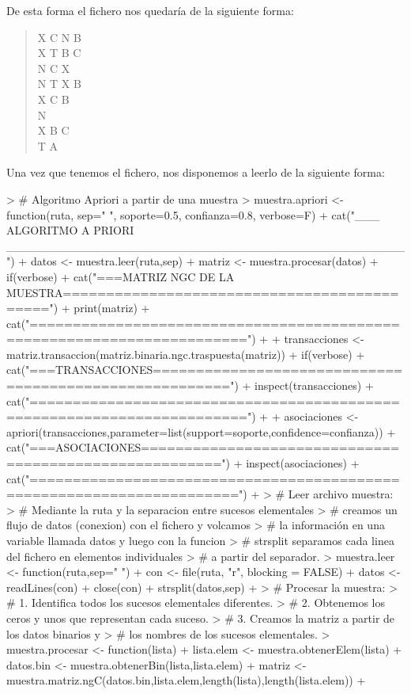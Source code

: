 \documentclass [a4paper] {article}
\begin{document}
De esta forma el fichero nos quedaría de la siguiente forma:
\begin{quote}
X C N B \\
X T B C \\
N C X \\
N T X B \\
X C B \\
N \\
X B C \\
T A \\

\end{quote}

Una vez que tenemos el fichero, nos disponemos a leerlo de la siguiente forma:

\newpage

\begin{Schunk}
\begin{Sinput}
> # Algoritmo Apriori a partir de una muestra
> muestra.apriori <- function(ruta, sep=" ", soporte=0.5, confianza=0.8, verbose=F){
+ 	cat("___ ALGORITMO A PRIORI ________________________________________________\n\n")
+ 	datos <- muestra.leer(ruta,sep)
+ 	matriz <- muestra.procesar(datos)
+ 	if(verbose){
+ 		cat("===MATRIZ NGC DE LA MUESTRA============================================\n")
+ 		print(matriz)
+ 		cat("=======================================================================\n\n")
+ 	}
+     transacciones <- matriz.transaccion(matriz.binaria.ngc.traspuesta(matriz))
+ 	if(verbose){
+ 		cat("===TRANSACCIONES=======================================================\n")
+ 		inspect(transacciones)
+ 		cat("=======================================================================\n\n")
+ 	}
+ 	asociaciones <- apriori(transacciones,parameter=list(support=soporte,confidence=confianza))	
+ 	cat("\n===ASOCIACIONES=======================================================\n")
+ 	inspect(asociaciones)
+ 	cat("======================================================================\n\n")
+ }
> # Leer archivo muestra:
> # Mediante la ruta y la separacion entre sucesos elementales
> # creamos un flujo de datos (conexion) con el fichero y volcamos
> # la información en una variable llamada datos y luego con la funcion
> # strsplit separamos cada linea del fichero en elementos individuales
> # a partir del separador.
> muestra.leer <- function(ruta,sep=" "){
+ 	con <- file(ruta, "r", blocking = FALSE)
+ 	datos <- readLines(con)
+ 	close(con)
+ 	strsplit(datos,sep)
+ }
> # Procesar la muestra:
> # 1. Identifica todos los sucesos elementales diferentes.
> # 2. Obtenemos los ceros y unos que representan cada suceso.
> # 3. Creamos la matriz a partir de los datos binarios y 
> #    los nombres de los sucesos elementales.
> muestra.procesar <- function(lista){
+ 	lista.elem <- muestra.obtenerElem(lista)
+ 	datos.bin <- muestra.obtenerBin(lista,lista.elem)
+ 	matriz <- muestra.matriz.ngC(datos.bin,lista.elem,length(lista),length(lista.elem))
+ }
\end{Sinput}
\end{Schunk}
\end{document}
